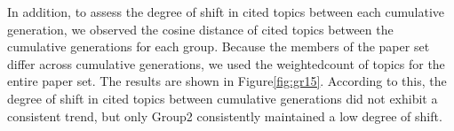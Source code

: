 In addition, to assess the degree of shift in cited topics between each cumulative generation, we observed the cosine distance of cited topics between the cumulative generations for each group. Because the members of the paper set differ across cumulative generations, we used the weightedcount of topics for the entire paper set. The results are shown in Figure\ref{fig:gr15}. According to this, the degree of shift in cited topics between cumulative generations did not exhibit a consistent trend, but only Group2 consistently maintained a low degree of shift.

